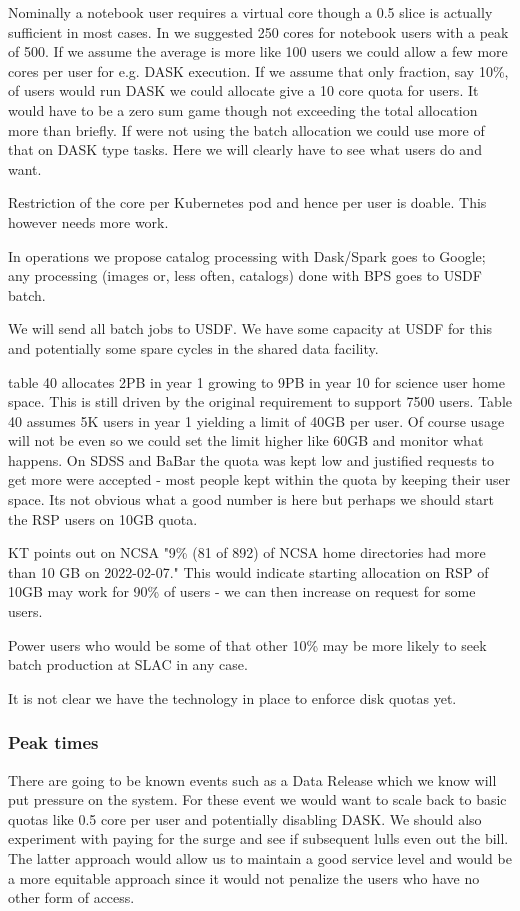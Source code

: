 Nominally a notebook user requires a virtual core though a 0.5 slice is actually sufficient in most cases.
In  we suggested 250 cores for notebook users with a peak of 500. If we assume the average is more like 100 users we could allow a few more cores per user for e.g. DASK execution. If we assume that only  fraction, say 10\%,  of users would run DASK we could allocate give a 10 core quota for users.
It would have to be a zero sum game though not exceeding the total allocation more than briefly.
If were not using the batch allocation we could use more of that on DASK type tasks.
Here we will clearly have to see what users do and want.

Restriction of the core per Kubernetes pod and hence per user is doable.
This however needs more work.


In operations we propose catalog processing with Dask/Spark goes to Google;
 any processing (images or, less often, catalogs) done with BPS goes to USDF batch.

We will  send all batch jobs to USDF. We have some capacity at USDF for this and potentially some spare cycles in the shared data facility.

 table 40 allocates 2PB in year 1 growing to 9PB in year 10 for science user home space.
This is still driven by the original requirement to support 7500 users. Table 40 assumes 5K users in year 1
yielding a limit of 40GB per user. Of course usage will not be even so we could set the limit higher like 60GB
and monitor what happens. On SDSS and BaBar the quota was kept low and justified requests to get more were accepted - most people kept within the quota by keeping their user space. Its not obvious what a good number is here but perhaps we should start the RSP users on 10GB quota.

KT points out on NCSA "9\% (81 of 892) of NCSA home directories had more than 10 GB on 2022-02-07."
This would indicate  starting allocation on RSP of 10GB may work for 90\% of  users - we can then increase on request for some users.

Power users who would be some of that other 10\% may be more likely to seek batch production at SLAC in any case.



It is not clear we have the technology in place to enforce disk quotas yet.

\subsubsection{Peak times}
There are going to be known events such as a Data Release which we know will put pressure on the system.
For these event we would want to scale back to basic quotas like 0.5 core per user  and potentially disabling DASK.
We should also experiment with paying for the surge and see if subsequent lulls even out the bill.
The latter approach would allow us to maintain a good service level and would be  a more equitable approach since it would
not penalize the users who have no other form of access.

